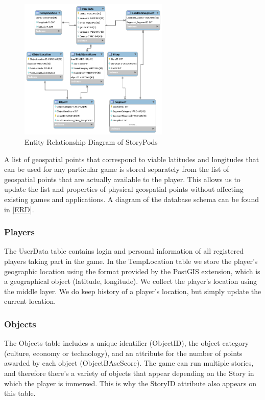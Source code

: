 \documentclass[conference]{IEEEtran}
\begin{document}
\begin{figure}[h]
\centering
\includegraphics[width=2.8in]{imgs/DatabaseSchema.png}
\caption{Entity Relationship Diagram of StoryPods}
\label{ERD}
\end{figure}

A list of geospatial points that correspond to viable latitudes and longitudes that can be used for any particular game is stored separately from the list of geospatial points that are actually available to the player. This allows us to update the list and properties of physical geospatial points without affecting existing games and applications. A diagram of the database schema can be found in \autoref{ERD}. 

\subsubsection*{Players}
The UserData table contains login and personal information of all registered players taking part in the game. In the TempLocation table we store the player’s geographic location using the format provided by the PostGIS extension, which is a geographical object (latitude, longitude). We collect the player's location using the middle layer. We do keep history of a player’s location, but simply update the current location.

\subsubsection*{Objects}
The Objects table includes a unique identifier (ObjectID), the object category (culture, economy or technology), and an attribute for the number of points awarded by each object (ObjectBAseScore). The game can run multiple stories, and therefore there’s a variety of objects that appear depending on the Story in which the player is immersed. This is why the StoryID attribute also appears on this table. 
\end{document}
